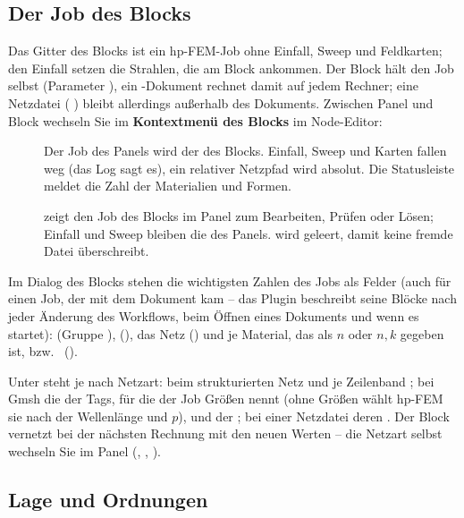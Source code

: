 \subsection{Der Job des Blocks}

Das Gitter des Blocks ist ein hp-FEM-Job ohne Einfall, Sweep und Feldkarten; den Einfall setzen
die Strahlen, die am Block ankommen. Der Block hält den Job selbst (Parameter ),
ein -Dokument rechnet damit auf jedem Rechner; eine Netzdatei (
) bleibt allerdings außerhalb des Dokuments. Zwischen Panel und Block wechseln Sie im
\textbf{Kontextmenü des Blocks} im Node-Editor:

\begin{description}
  \item[] Der Job des Panels wird der des Blocks. Einfall, Sweep und Karten
    fallen weg (das Log sagt es), ein relativer Netzpfad wird absolut. Die Statusleiste meldet die
    Zahl der Materialien und Formen.
  \item[] zeigt den Job des Blocks im Panel zum Bearbeiten, Prüfen
    oder Lösen; Einfall und Sweep bleiben die des Panels.  wird geleert, damit
     keine fremde Datei überschreibt.
\end{description}

Im Dialog des Blocks stehen die wichtigsten Zahlen des Jobs als Felder (auch für einen Job, der mit
dem Dokument kam -- das Plugin beschreibt seine Blöcke nach jeder Änderung des Workflows, beim
Öffnen eines Dokuments und wenn es startet):  (Gruppe ),
 (), das Netz () und je Material, das als $n$ oder
$n, k$ gegeben ist,  bzw.\  ().

Unter  steht je nach Netzart: beim strukturierten Netz  und je Zeilenband
; bei Gmsh die  der Tags, für die der Job
Größen nennt (ohne Größen wählt hp-FEM sie nach der Wellenlänge und $p$), und der
; bei einer Netzdatei deren . Der Block vernetzt bei der nächsten
Rechnung mit den neuen Werten -- die Netzart selbst wechseln Sie im Panel (, , ).

\subsection{Lage und Ordnungen}

